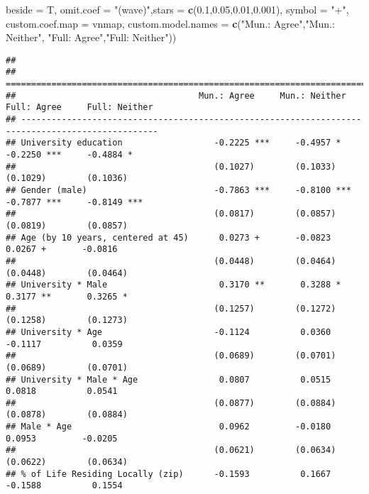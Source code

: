 \documentclass[
]{article}
\newenvironment{Shaded}{\begin{snugshade}}{\end{snugshade}}
\newcommand{\DataTypeTok}[1]{\textcolor[rgb]{0.13,0.29,0.53}{#1}}
\newcommand{\FloatTok}[1]{\textcolor[rgb]{0.00,0.00,0.81}{#1}}
\newcommand{\KeywordTok}[1]{\textcolor[rgb]{0.13,0.29,0.53}{\textbf{#1}}}
\newcommand{\NormalTok}[1]{#1}
\newcommand{\StringTok}[1]{\textcolor[rgb]{0.31,0.60,0.02}{#1}}
\begin{document}
\begin{Shaded}
\begin{Highlighting}[]
          \DataTypeTok{beside =}\NormalTok{ T,}
          \DataTypeTok{omit.coef =} \StringTok{"(wave)"}\NormalTok{,}\DataTypeTok{stars =} \KeywordTok{c}\NormalTok{(}\FloatTok{0.1}\NormalTok{,}\FloatTok{0.05}\NormalTok{,}\FloatTok{0.01}\NormalTok{,}\FloatTok{0.001}\NormalTok{), }\DataTypeTok{symbol =} \StringTok{"+"}\NormalTok{,}
          \DataTypeTok{custom.coef.map =}\NormalTok{ vnmap,}
          \DataTypeTok{custom.model.names =} \KeywordTok{c}\NormalTok{(}\StringTok{"Mun.: Agree"}\NormalTok{,}\StringTok{"Mun.: Neither"}\NormalTok{,}
                                 \StringTok{"Full: Agree"}\NormalTok{,}\StringTok{"Full: Neither"}\NormalTok{))}
\end{Highlighting}
\end{Shaded}

\begin{verbatim}
## 
## =================================================================================================
##                                    Mun.: Agree     Mun.: Neither   Full: Agree     Full: Neither 
## -------------------------------------------------------------------------------------------------
## University education                  -0.2225 ***     -0.4957 *       -0.2250 ***     -0.4884 *  
##                                       (0.1027)        (0.1033)        (0.1029)        (0.1036)   
## Gender (male)                         -0.7863 ***     -0.8100 ***     -0.7877 ***     -0.8149 ***
##                                       (0.0817)        (0.0857)        (0.0819)        (0.0857)   
## Age (by 10 years, centered at 45)      0.0273 +       -0.0823          0.0267 +       -0.0816    
##                                       (0.0448)        (0.0464)        (0.0448)        (0.0464)   
## University * Male                      0.3170 **       0.3288 *        0.3177 **       0.3265 *  
##                                       (0.1257)        (0.1272)        (0.1258)        (0.1273)   
## University * Age                      -0.1124          0.0360         -0.1117          0.0359    
##                                       (0.0689)        (0.0701)        (0.0689)        (0.0701)   
## University * Male * Age                0.0807          0.0515          0.0818          0.0541    
##                                       (0.0877)        (0.0884)        (0.0878)        (0.0884)   
## Male * Age                             0.0962         -0.0180          0.0953         -0.0205    
##                                       (0.0621)        (0.0634)        (0.0622)        (0.0634)   
## % of Life Residing Locally (zip)      -0.1593          0.1667         -0.1588          0.1554    

\end{verbatim}
\end{document}
